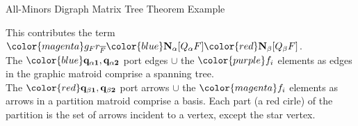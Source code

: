 \documentclass{beamer}
\newcommand{\ext}[1]{\ensuremath{\mathbf{#1}}}
\begin{document}
\begin{frame}{All-Minors Digraph Matrix Tree Theorem Example}
  \begin{center}
    
  \end{center}
  \begin{center}
    This contributes the term\\
    ${\color{magenta}g_F r_{\overline{F}}}{\color{blue}\ext{N}_\alpha[Q_\alpha F]}
    {\color{red}\ext{N}_\beta[Q_\beta F]}$.\\
    The {$\color{blue}\mathbf{q_{\alpha 1},q_{\alpha 2}}$ port edges} $\cup$  the
    {$\color{purple}f_i$} elements {\color{blue}as edges in the graphic matroid} comprise
    a spanning tree.\\
     The {$\color{red}\mathbf{q_{\beta 1},q_{\beta 2}}$ port arrows} $\cup$  the
    {$\color{magenta}f_i$} elements {\color{red} as arrows in a partition matroid} comprise
    a basis.  Each {\color{red}part (a red cirle)} of the partition is the
    set of {\color{red}arrows} incident to a vertex, except the star vertex.
  \end{center}
\end{frame}

\end{document}
